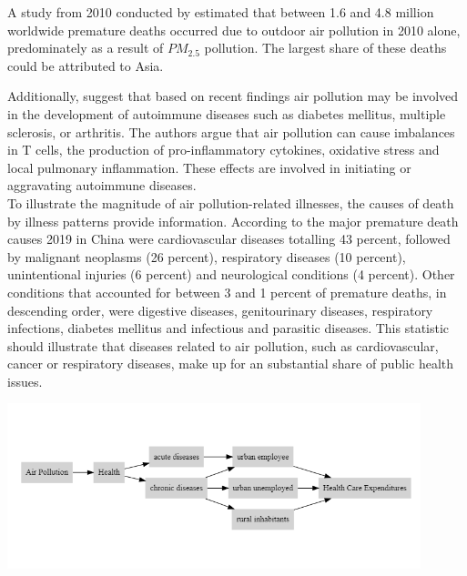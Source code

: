 \documentclass[
]{article}
\begin{document}
	A study from 2010 conducted by \cite{LEL2015} estimated that between 1.6 and 4.8 million worldwide premature deaths occurred due to outdoor air pollution in 2010 alone, predominately as a result of $PM_2.5$ pollution. The largest share of these deaths could be attributed to Asia. 
	
	Additionally, \cite{zhao2019emerging} suggest that based on recent findings air pollution may be involved in the development of autoimmune diseases such as diabetes mellitus, multiple sclerosis, or arthritis. The authors argue that air pollution can cause imbalances in T cells, the production of pro-inflammatory cytokines, oxidative stress and local pulmonary inflammation. These effects are involved in initiating or aggravating autoimmune diseases. \\ 
	
	To illustrate the magnitude of air pollution-related illnesses, the causes of death by illness patterns provide information. According to \cite{who_nodate} the major premature death causes 2019 in China were cardiovascular diseases totalling 43 percent, followed by malignant neoplasms (26 percent), respiratory diseases (10 percent), unintentional injuries (6 percent) and neurological conditions (4 percent). Other conditions that accounted for between 3 and 1 percent of premature deaths, in descending order, were digestive diseases, genitourinary diseases, respiratory infections, diabetes mellitus and infectious and parasitic diseases. This statistic should illustrate that diseases related to air pollution, such as cardiovascular, cancer or respiratory diseases, make up for an substantial share of public health issues. \\ 
	
	\begin{center}
		\includegraphics[width=0.9\textwidth]{DAG_true.png} 
		\label{fig:dag}
	\end{center}
\end{document}
